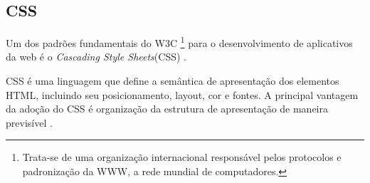
\subsection{CSS}
Um dos padrões fundamentais do W3C \footnote{Trata-se de uma organização internacional responsável pelos protocolos e padronização da WWW, a rede mundial de computadores.} para o desenvolvimento de aplicativos da web é o \textit{Cascading Style Sheets}(CSS) \cite{Casca8378199:online,css}.

CSS é uma linguagem que define a semântica de apresentação dos elementos HTML, incluindo seu posicionamento, layout, cor e fontes. A principal vantagem da adoção do CSS é organização da estrutura de apresentação de maneira previsível . \cite{badros1999constraint}








